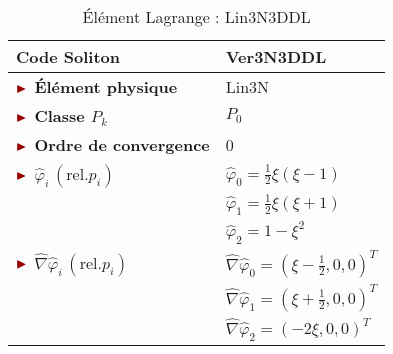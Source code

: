 \begin{table}[H]
	\begin{minipage}[t]{0.48\linewidth}
		\centering
		\begin{tabular}{>{\bfseries} l|l}
			\toprule %
			\rowcolor{black!10}\rowstyle{\color{MyRed}\bfseries} Code Soliton & \textcolor{MyRed}{\textbf{Ver3N3DDL}}\\
			\midrule
			$\mytriangle$ Élément physique & \textcolor{MyRed}{Lin3N}\\
			$\mytriangle$ Classe $P_k$ & $P_0$\\
			$\mytriangle$ Ordre de convergence & 0\\
			\midrule
			$\mytriangle$ $\widehat{\varphi}_i\, (\text{rel.} p_i)$ &  $\widehat{\varphi}_0 = \frac{1}{2} \xi (\xi - 1)$\\
			&  $\widehat{\varphi}_1 = \frac{1}{2}\xi(\xi+1)$\\
			&  $\widehat{\varphi}_2 = 1-\xi^2$\\
			\midrule
			$\mytriangle$ $\widehat{\nabla}\widehat{\varphi}_i\, (\text{rel.} p_i)$ & $\widehat{\nabla}\widehat{\varphi}_0 = \left(\xi - \frac{1}{2}, 0, 0\right)^T$ \\
			& $\widehat{\nabla}\widehat{\varphi}_1 = \left(\xi + \frac{1}{2}, 0, 0\right)^T$ \\
			& $\widehat{\nabla}\widehat{\varphi}_2 = \left(-2\xi, 0, 0\right)^T$ \\
			\bottomrule %
		\end{tabular}
		\caption{Élément Lagrange : Lin3N3DDL}
		\label{tab:Lin3N3DDL}
	\end{minipage}\hfill
\end{table}
 
